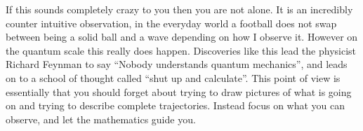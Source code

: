 If this sounds completely crazy to you then you are not alone. It is an incredibly counter intuitive observation, in the everyday world a football does not swap between being a solid ball and a wave depending on how I observe it. However on the quantum scale this really does happen. Discoveries like this lead the physicist Richard Feynman to say ``Nobody understands quantum mechanics'', and leads on to a school of thought called ``shut up and calculate''. This point of view is essentially that you should forget about trying to draw pictures of what is going on  and trying to describe complete trajectories. Instead focus on what you can observe, and let the mathematics guide you. 
